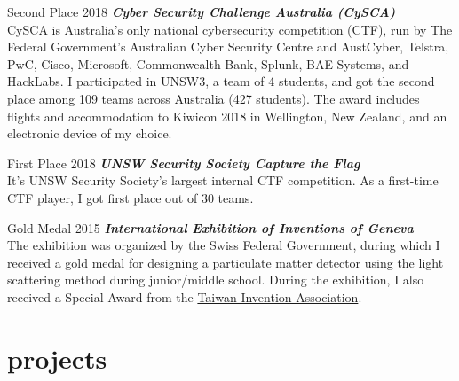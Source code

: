 \documentclass[hidelinks__VERSION__]{adamyi-cv}
\begin{document}
\begin{entrylist}


\entry
{Second Place}
{2018}
{\emph{\textbf{Cyber Security Challenge Australia (CySCA)}}\\
CySCA is Australia’s only national cybersecurity competition (CTF), run by The Federal Government’s Australian Cyber Security Centre and AustCyber, Telstra, PwC, Cisco, Microsoft, Commonwealth Bank, Splunk, BAE Systems, and HackLabs. I participated in UNSW3, a team of 4 students, and got the second place among 109 teams across Australia (427 students). The award includes flights and accommodation to Kiwicon 2018 in Wellington, New Zealand, and an electronic device of my choice.
}


\entry
{First Place}
{2018}
{\emph{\textbf{UNSW Security Society Capture the Flag}}\\
It's UNSW Security Society's largest internal CTF competition. As a first-time CTF player, I got first place out of 30 teams.
}


\entry
{Gold Medal}
{2015}
{\emph{\textbf{International Exhibition of Inventions of Geneva}}\\
The exhibition was organized by the Swiss Federal Government, during which I received a gold medal for designing a particulate matter detector using the light scattering method during junior/middle school. During the exhibition, I also received a Special Award from the \href{http://www.tia-tw.net/}{Taiwan Invention Association}.
}


\end{entrylist}

\pagebreak


\section{projects}
\end{document}
